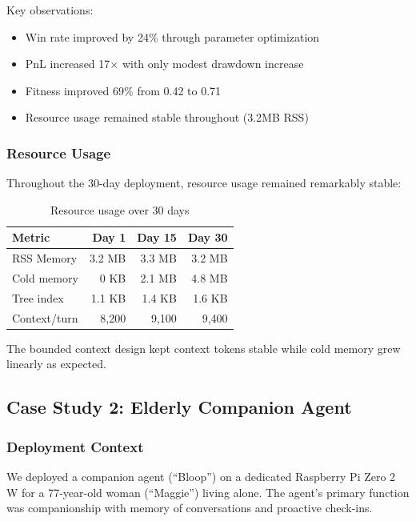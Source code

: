 \documentclass{article}
\begin{document}
Key observations:
\begin{itemize}[leftmargin=*]
    \item Win rate improved by 24\% through parameter optimization
    \item PnL increased 17$\times$ with only modest drawdown increase
    \item Fitness improved 69\% from 0.42 to 0.71
    \item Resource usage remained stable throughout (3.2MB RSS)
\end{itemize}

\subsubsection{Resource Usage}

Throughout the 30-day deployment, resource usage remained remarkably stable:

\begin{table}[h]
\centering
\caption{Resource usage over 30 days}
\label{tab:pi_resources}
\begin{tabular}{lrrr}
\toprule
\textbf{Metric} & \textbf{Day 1} & \textbf{Day 15} & \textbf{Day 30} \\
\midrule
RSS Memory & 3.2 MB & 3.3 MB & 3.2 MB \\
Cold memory & 0 KB & 2.1 MB & 4.8 MB \\
Tree index & 1.1 KB & 1.4 KB & 1.6 KB \\
Context/turn & 8,200 & 9,100 & 9,400 \\
\bottomrule
\end{tabular}
\end{table}

The bounded context design kept context tokens stable while cold memory grew linearly as expected.

\subsection{Case Study 2: Elderly Companion Agent}

\subsubsection{Deployment Context}

We deployed a companion agent (``Bloop'') on a dedicated Raspberry Pi Zero 2 W for a 77-year-old woman (``Maggie'') living alone. The agent's primary function was companionship with memory of conversations and proactive check-ins.
\end{document}
